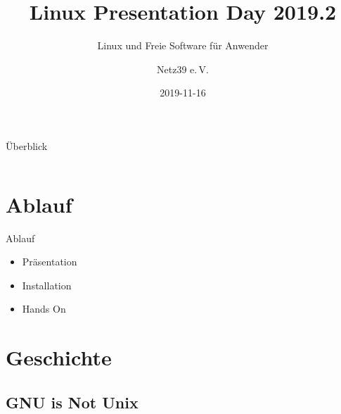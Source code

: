 \documentclass{beamer}
\title{Linux Presentation Day 2019.2}
\subtitle{Linux und Freie Software für Anwender}
\author{Netz39 e.\,V.}
\institute{\url{http://www.netz39.de/}}
\date{2019-11-16}
\begin{document}
\begin{frame}
	\titlepage
\end{frame}

\logo{}

\begin{frame}{Überblick}
    \begin{columns}[T]
        \begin{column}{0.5\textwidth}
            \tableofcontents
        \end{column}
        \begin{column}{0.5\textwidth}
            
        \end{column}
    \end{columns}
\end{frame}

\section{Ablauf}

\begin{frame}{Ablauf}
    \begin{itemize}
        \item Präsentation
        \item Installation
        \item Hands On
    \end{itemize}
\end{frame}

\section{Geschichte}

\frame{\tableofcontents[currentsection]}

\subsection{GNU is Not Unix}
\end{document}
